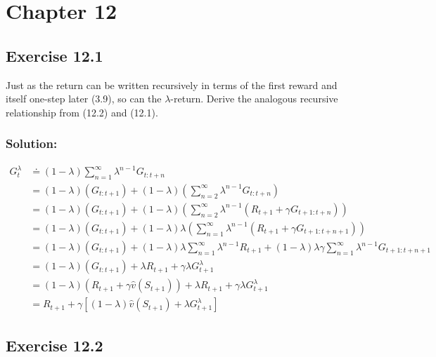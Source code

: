 \section*{Chapter 12}

\subsection*{Exercise 12.1}

Just as the return can be written recursively in terms of the first reward and
itself one-step later (3.9), so can the $\lambda$-return. Derive the analogous recursive relationship
from (12.2) and (12.1).

\subsubsection*{Solution:}

\begin{align*}
    G_t^\lambda &\doteq (1 - \lambda) \sum_{n=1}^\infty \lambda^{n-1} G_{t:t+n} \\
    &= (1 - \lambda) \left( G_{t:t+1} \right) + (1 - \lambda) \left( \sum_{n=2}^\infty \lambda^{n-1} G_{t:t+n} \right) \\
    &= (1 - \lambda) \left( G_{t:t+1} \right) + (1 - \lambda) \left( \sum_{n=2}^\infty \lambda^{n-1} \left( R_{t+1} + \gamma G_{t+1:t+n} \right) \right) \\
    &= (1 - \lambda) \left( G_{t:t+1} \right) + (1 - \lambda) \lambda \left( \sum_{n=1}^\infty \lambda^{n-1} \left( R_{t+1} + \gamma G_{t+1:t+n+1} \right) \right) \\
    &= (1 - \lambda) \left( G_{t:t+1} \right) + (1 - \lambda) \lambda \sum_{n=1}^\infty \lambda^{n-1}  R_{t+1} +  (1 - \lambda) \lambda \gamma \sum_{n=1}^\infty \lambda^{n-1} G_{t+1:t+n+1} \\
    &= (1 - \lambda) \left( G_{t:t+1} \right) + \lambda R_{t+1} + \gamma \lambda  G_{t+1}^\lambda\\
    &= (1 - \lambda) \left( R_{t+1} + \gamma \hat{v}(S_{t+1})\right) + \lambda R_{t+1} + \gamma \lambda  G_{t+1}^\lambda\\
    &= R_{t+1} + \gamma \left[(1-\lambda) \hat{v}(S_{t+1}) + \lambda  G_{t+1}^\lambda \right]
\end{align*}


\subsection*{Exercise 12.2}

